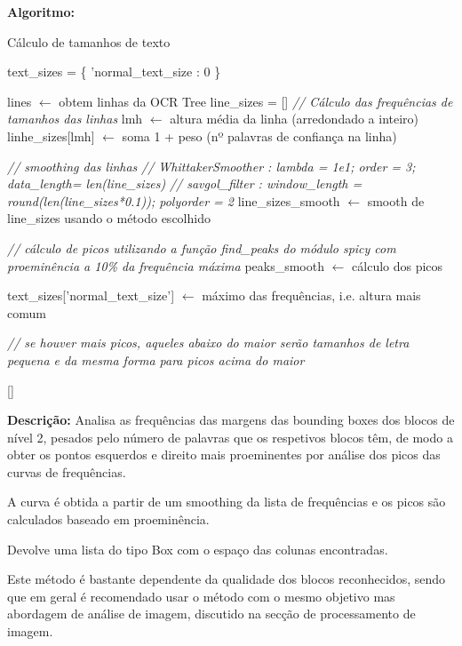 \textbf{Algoritmo:}
\begin{algorithm}[H]
	\caption{Cálculo de tamanhos de texto}
	\begin{algorithmic}[1]
		
		\STATE text\_sizes = \{
			'normal\_text\_size : 0
		\}
		
		\STATE lines $\leftarrow$ obtem linhas da OCR Tree
		\STATE line\_sizes = []
		\STATE \textit{// Cálculo das frequências de tamanhos das linhas}
				\STATE lmh $\leftarrow$ altura média da linha (arredondado a inteiro)
				\STATE linhe\_sizes[lmh] $\leftarrow$ soma 1 + peso (nº palavras de confiança na linha)
			\ENDIF
		\ENDFOR
		
		\STATE \textit{// smoothing das linhas}
		\STATE \textit{// WhittakerSmoother : lambda = 1e1; order = 3; data\_length= len(line\_sizes)}
		\STATE \textit{// savgol\_filter : window\_length = round(len(line\_sizes*0.1)); polyorder = 2}
		\STATE line\_sizes\_smooth $\leftarrow$ smooth de line\_sizes usando o método escolhido
		
		\STATE \textit{// cálculo de picos utilizando a função find\_peaks do módulo spicy com proeminência a 10\% da frequência máxima}
		\STATE peaks\_smooth $\leftarrow$ cálculo dos picos
		
		\STATE text\_sizes['normal\_text\_size'] $\leftarrow$ máximo das frequências, i.e. altura mais comum
		
		\STATE \textit{// se houver mais picos, aqueles abaixo do maior serão tamanhos de letra pequena e da mesma forma para picos acima do maior}
		
	\end{algorithmic}
\end{algorithm}


[\normalsize]

\textbf{Descrição:} Analisa as frequências das margens das bounding boxes dos blocos de nível 2, pesados pelo número de palavras que os respetivos blocos têm, de modo a obter os pontos esquerdos e direito mais proeminentes por análise dos picos das curvas de frequências.

A curva é obtida a partir de um smoothing da lista de frequências e os picos são calculados baseado em proeminência.

Devolve uma lista do tipo Box com o espaço das colunas encontradas.

Este método é bastante dependente da qualidade dos blocos reconhecidos, sendo que em geral é recomendado usar o método com o mesmo objetivo mas abordagem de análise de imagem, discutido na secção de processamento de imagem.

